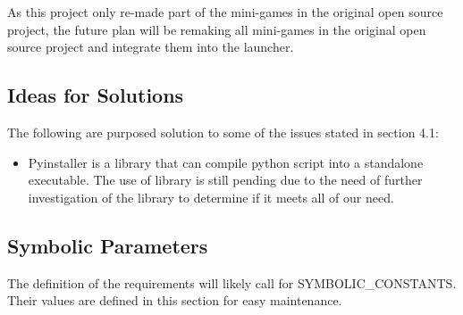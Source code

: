 \documentclass[12pt, titlepage]{article}
\begin{document}
As this project only re-made part of the mini-games in the original open source project, the future plan will be remaking all mini-games in the original open source project and integrate them into the launcher.

\subsection{Ideas for Solutions}

The following are purposed solution to some of the issues stated in section 4.1:
\begin{itemize}
    \item Pyinstaller is a library that can compile python script into a standalone executable. The use of library is still pending due to the need of further investigation of the library to determine if it meets all of our need.
\end{itemize}





\newpage

\subsection{Symbolic Parameters}

The definition of the requirements will likely call for SYMBOLIC\_CONSTANTS.
Their values are defined in this section for easy maintenance.
\end{document}
